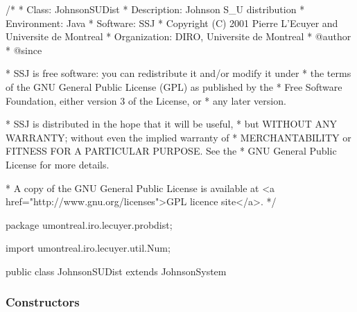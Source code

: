 \begin{code}
\begin{hide}
/*
 * Class:        JohnsonSUDist
 * Description:  Johnson S_U distribution
 * Environment:  Java
 * Software:     SSJ
 * Copyright (C) 2001  Pierre L'Ecuyer and Universite de Montreal
 * Organization: DIRO, Universite de Montreal
 * @author
 * @since

 * SSJ is free software: you can redistribute it and/or modify it under
 * the terms of the GNU General Public License (GPL) as published by the
 * Free Software Foundation, either version 3 of the License, or
 * any later version.

 * SSJ is distributed in the hope that it will be useful,
 * but WITHOUT ANY WARRANTY; without even the implied warranty of
 * MERCHANTABILITY or FITNESS FOR A PARTICULAR PURPOSE.  See the
 * GNU General Public License for more details.

 * A copy of the GNU General Public License is available at
   <a href="http://www.gnu.org/licenses">GPL licence site</a>.
 */
\end{hide}
package umontreal.iro.lecuyer.probdist;\begin{hide}
import umontreal.iro.lecuyer.util.Num;
\end{hide}

public class JohnsonSUDist extends JohnsonSystem\begin{hide} {

   private static double calcR (double a, double b, double x) {
      /*** cette fonction calcule
                 r = z + sqrt(z*z + 1)
           en utilisant un algorithme stable
       ***/

      double z = (x - a)/b;

      double s = Math.abs(z);
      if (s < 1.0e20)
         s = Math.sqrt (z * z + 1.0);

      // compute r = z + sqrt (z * z + 1)
      double r;
      if (z >= 0.0)
         r = s + z;
      else
         r = 1.0/(s - z);

      return r;
   }
\end{hide}
\end{code}
\subsubsection* {Constructors}

